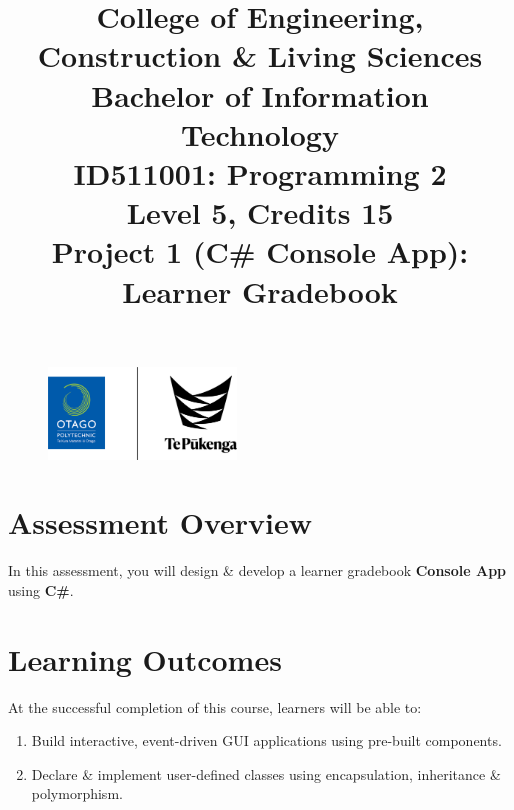 \documentclass{article}
\author{}
\begin{document}
 

\begin{figure}
    \centering
    \includegraphics[width=50mm]{../../resources/img/logo.png}
\end{figure}

\title{College of Engineering, Construction \& Living Sciences\\Bachelor of Information Technology\\ID511001: Programming 2\\Level 5, Credits 15\\\textbf{Project 1 (C\# Console App): Learner Gradebook}}
\date{}
\maketitle

\section*{Assessment Overview}
In this assessment, you will design \& develop a learner gradebook \textbf{Console App} using \textbf{C\#}. 

\section*{Learning Outcomes}
At the successful completion of this course, learners will be able to:
\begin{enumerate}
    \item Build interactive, event-driven GUI applications using pre-built components.
    \item Declare \& implement user-defined classes using encapsulation, inheritance \& polymorphism.
\end{enumerate}
\end{document}
